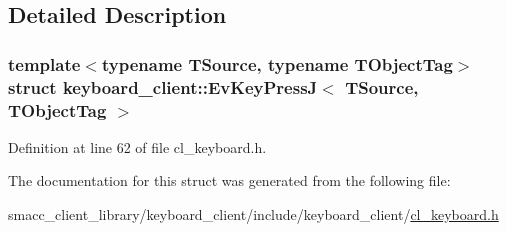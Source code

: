 \subsection{Detailed Description}
\subsubsection*{template$<$typename T\+Source, typename T\+Object\+Tag$>$\newline
struct keyboard\+\_\+client\+::\+Ev\+Key\+Press\+J$<$ T\+Source, T\+Object\+Tag $>$}



Definition at line 62 of file cl\+\_\+keyboard.\+h.



The documentation for this struct was generated from the following file\+:\begin{DoxyCompactItemize}
\item 
smacc\+\_\+client\+\_\+library/keyboard\+\_\+client/include/keyboard\+\_\+client/\hyperlink{cl__keyboard_8h}{cl\+\_\+keyboard.\+h}\end{DoxyCompactItemize}

